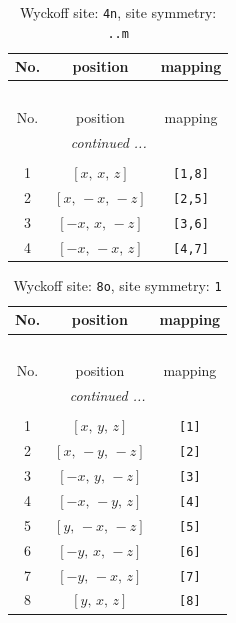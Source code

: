 \documentclass[fleqn,8pt]{jsarticle}
\begin{document}
\renewcommand{\arraystretch}{1.2}
\begin{longtable}{ccc}
\caption{Wyckoff site: {\tt 4n}, site symmetry: {\tt ..m}}
 \\
 \hline \hline
No. & position & mapping \\ \hline \endfirsthead

\multicolumn{2}{l}{\tablename\ \thetable{}} \\
 \hline \hline
No. & position & mapping \\ \hline \endhead

 \hline \hline
\multicolumn{2}{r}{\footnotesize\it continued ...} \\ \endfoot

 \hline \hline
\multicolumn{2}{r}{} \\ \endlastfoot

1 & $\left[ x,\, x,\, z \right]$ & {\tt [1,8]} \\ \hline
2 & $\left[ x,\, - x,\, - z \right]$ & {\tt [2,5]} \\ \hline
3 & $\left[ - x,\, x,\, - z \right]$ & {\tt [3,6]} \\ \hline
4 & $\left[ - x,\, - x,\, z \right]$ & {\tt [4,7]} \\
\end{longtable}
\renewcommand{\arraystretch}{1.2}
\begin{longtable}{ccc}
\caption{Wyckoff site: {\tt 8o}, site symmetry: {\tt 1}}
 \\
 \hline \hline
No. & position & mapping \\ \hline \endfirsthead

\multicolumn{2}{l}{\tablename\ \thetable{}} \\
 \hline \hline
No. & position & mapping \\ \hline \endhead

 \hline \hline
\multicolumn{2}{r}{\footnotesize\it continued ...} \\ \endfoot

 \hline \hline
\multicolumn{2}{r}{} \\ \endlastfoot

1 & $\left[ x,\, y,\, z \right]$ & {\tt [1]} \\ \hline
2 & $\left[ x,\, - y,\, - z \right]$ & {\tt [2]} \\ \hline
3 & $\left[ - x,\, y,\, - z \right]$ & {\tt [3]} \\ \hline
4 & $\left[ - x,\, - y,\, z \right]$ & {\tt [4]} \\ \hline
5 & $\left[ y,\, - x,\, - z \right]$ & {\tt [5]} \\ \hline
6 & $\left[ - y,\, x,\, - z \right]$ & {\tt [6]} \\ \hline
7 & $\left[ - y,\, - x,\, z \right]$ & {\tt [7]} \\ \hline
8 & $\left[ y,\, x,\, z \right]$ & {\tt [8]} \\
\end{longtable}
\end{document}
